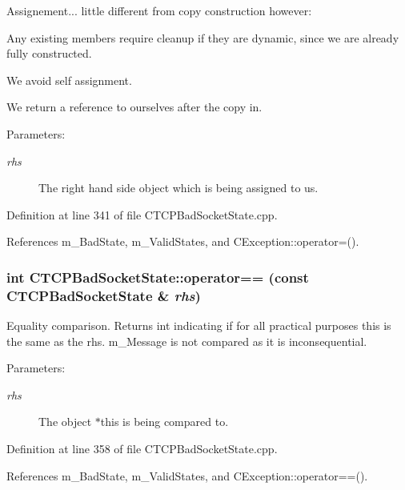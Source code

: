 Assignement... little different from copy construction however:\begin{CompactItemize}
\item 
Any existing members require cleanup if they are dynamic, since we are already fully constructed.\item 
We avoid self assignment.\item 
We return a reference to ourselves after the copy in.\end{CompactItemize}
\begin{Desc}
\item[Parameters: ]\par
\begin{description}
\item[{\em 
rhs}]The right hand side object which is being assigned to us. \end{description}
\end{Desc}


Definition at line 341 of file CTCPBad\-Socket\-State.cpp.

References m\_\-Bad\-State, m\_\-Valid\-States, and CException::operator=().
\subsubsection{\setlength{\rightskip}{0pt plus 5cm}int CTCPBad\-Socket\-State::operator== (const CTCPBad\-Socket\-State \& {\em rhs})}\label{classCTCPBadSocketState_a4}


Equality comparison. Returns int indicating if for all practical purposes this is the same as the rhs. m\_\-Message is not compared as it is  inconsequential. \begin{Desc}
\item[Parameters: ]\par
\begin{description}
\item[{\em 
rhs}]The object $\ast$this is being compared to. \end{description}
\end{Desc}


Definition at line 358 of file CTCPBad\-Socket\-State.cpp.

References m\_\-Bad\-State, m\_\-Valid\-States, and CException::operator==().
